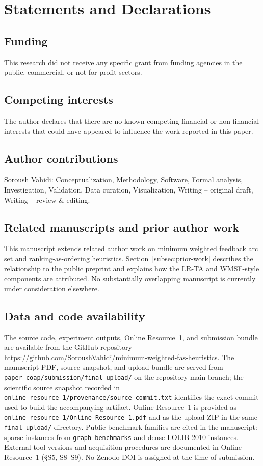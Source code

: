 \section*{Statements and Declarations}

\subsection*{Funding}
This research did not receive any specific grant from funding agencies in the public, commercial, or not-for-profit sectors.

\subsection*{Competing interests}
The author declares that there are no known competing financial or non-financial interests that could have appeared to influence the work reported in this paper.

\subsection*{Author contributions}
Soroush Vahidi: Conceptualization, Methodology, Software, Formal analysis, Investigation, Validation, Data curation, Visualization, Writing -- original draft, Writing -- review \& editing.

\subsection*{Related manuscripts and prior author work}
This manuscript extends related author work on minimum weighted feedback arc set and ranking-as-ordering heuristics. Section~\ref{subsec:prior-work} describes the relationship to the public preprint \cite{VahidiKoutis2024arxiv} and explains how the LR-TA and WMSF-style components are attributed. No substantially overlapping manuscript is currently under consideration elsewhere.

\subsection*{Data and code availability}
The source code, experiment outputs, Online Resource~1, and submission bundle are available from the GitHub repository \href{https://github.com/SoroushVahidi/minimum-weighted-fas-heuristics}{https://github.com/SoroushVahidi/minimum-weighted-fas-heuristics}. The manuscript PDF, source snapshot, and upload bundle are served from \texttt{paper\_coap/submission/final\_upload/} on the repository main branch; the scientific source snapshot recorded in \texttt{online\_resource\_1/provenance/source\_commit.txt} identifies the exact commit used to build the accompanying artifact. Online Resource~1 is provided as \texttt{online\_resource\_1/Online\_Resource\_1.pdf} and as the upload ZIP in the same \texttt{final\_upload/} directory. Public benchmark families are cited in the manuscript: sparse instances from \texttt{graph-benchmarks} and dense LOLIB 2010 instances. External-tool versions and acquisition procedures are documented in Online Resource~1 (\S S5, S8--S9). No Zenodo DOI is assigned at the time of submission.

